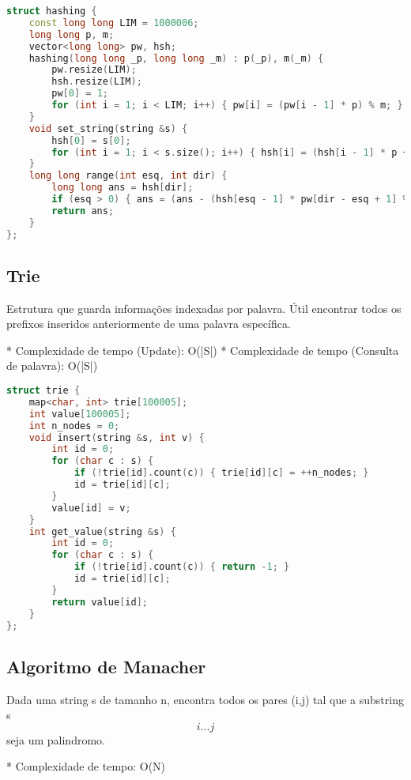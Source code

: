 \documentclass[11pt, a4paper, twoside]{article}
\begin{document}
\begin{lstlisting}[language=C++]
struct hashing {
    const long long LIM = 1000006;
    long long p, m;
    vector<long long> pw, hsh;
    hashing(long long _p, long long _m) : p(_p), m(_m) {
        pw.resize(LIM);
        hsh.resize(LIM);
        pw[0] = 1;
        for (int i = 1; i < LIM; i++) { pw[i] = (pw[i - 1] * p) % m; }
    }
    void set_string(string &s) {
        hsh[0] = s[0];
        for (int i = 1; i < s.size(); i++) { hsh[i] = (hsh[i - 1] * p + s[i]) % m; }
    }
    long long range(int esq, int dir) {
        long long ans = hsh[dir];
        if (esq > 0) { ans = (ans - (hsh[esq - 1] * pw[dir - esq + 1] % m) + m) % m; }
        return ans;
    }
};
\end{lstlisting}

\subsection{Trie}



Estrutura que guarda informações indexadas por palavra.   
Útil encontrar todos os prefixos inseridos anteriormente de uma palavra específica.

* Complexidade de tempo (Update): O(|S|)
* Complexidade de tempo (Consulta de palavra): O(|S|)

\begin{lstlisting}[language=C++]
struct trie {
    map<char, int> trie[100005];
    int value[100005];
    int n_nodes = 0;
    void insert(string &s, int v) {
        int id = 0;
        for (char c : s) {
            if (!trie[id].count(c)) { trie[id][c] = ++n_nodes; }
            id = trie[id][c];
        }
        value[id] = v;
    }
    int get_value(string &s) {
        int id = 0;
        for (char c : s) {
            if (!trie[id].count(c)) { return -1; }
            id = trie[id][c];
        }
        return value[id];
    }
};
\end{lstlisting}

\subsection{Algoritmo de Manacher}



Dada uma string s de tamanho n, encontra todos os pares (i,j) tal que a substring s\[i...j\] seja um palindromo.

* Complexidade de tempo: O(N)
\end{document}
